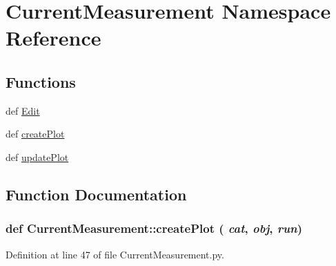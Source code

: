 \hypertarget{namespaceCurrentMeasurement}{
\section{CurrentMeasurement Namespace Reference}
\label{namespaceCurrentMeasurement}
}
\subsection*{Functions}
\begin{DoxyCompactItemize}
\item 
def \hyperlink{namespaceCurrentMeasurement_a61f2879fa568ed0a21e0418f3e4d7125}{Edit}
\item 
def \hyperlink{namespaceCurrentMeasurement_a17d45786188e53658eacf00a37225d8d}{createPlot}
\item 
def \hyperlink{namespaceCurrentMeasurement_a115af1da683fe870c7428745c6771c1b}{updatePlot}
\end{DoxyCompactItemize}


\subsection{Function Documentation}
\hypertarget{namespaceCurrentMeasurement_a17d45786188e53658eacf00a37225d8d}{
\subsubsection[{createPlot}]{\setlength{\rightskip}{0pt plus 5cm}def CurrentMeasurement::createPlot ( {\em cat}, \/   {\em obj}, \/   {\em run})}}
\label{namespaceCurrentMeasurement_a17d45786188e53658eacf00a37225d8d}


Definition at line 47 of file CurrentMeasurement.py.


